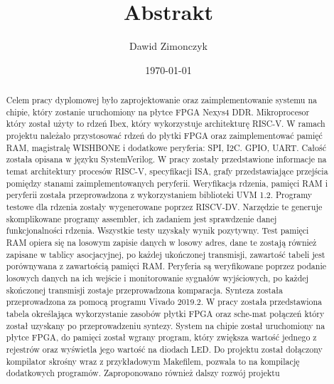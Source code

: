 \documentclass[12pt,a4paper]{article}
\title{Abstrakt}
\author{Dawid Zimonczyk}
\date{\today}
\begin{document}
\renewcommand{\abstractname}{Abstrakt}
\begin{abstract}

Celem pracy dyplomowej było zaprojektowanie oraz zaimplementowanie systemu na chipie, który zostanie uruchomiony na płytce FPGA Nexys4 DDR. Mikroprocesor który został użyty to rdzeń Ibex, który wykorzystuje architekturę RISC-V. W ramach projektu należało przystosować rdzeń do płytki FPGA oraz zaimplementować pamięć RAM, magistralę WISHBONE i dodatkowe peryferia: SPI, I2C. GPIO, UART. Całość została opisana w języku SystemVerilog. W pracy zostały przedstawione informacje na temat architektury procesów RISC-V, specyfikacji ISA, grafy przedstawiające przejścia pomiędzy stanami zaimplementowanych peryferii. Weryfikacja rdzenia, pamięci RAM i peryferii została przeprowadzona z wykorzystaniem biblioteki UVM 1.2. Programy testowe dla rdzenia zostały wygenerowane poprzez RISCV-DV. Narzędzie te generuje skomplikowane programy assembler, ich zadaniem jest sprawdzenie danej funkcjonalności rdzenia. Wszystkie testy uzyskały wynik pozytywny. Test pamięci RAM opiera się na losowym zapisie danych w losowy adres, dane te zostają również zapisane w tablicy asocjacyjnej, po każdej ukończonej transmisji, zawartość tabeli jest porównywana z zawartością pamięci RAM. Peryferia są weryfikowane poprzez podanie losowych danych na ich wejście i monitorowanie sygnałów wyjściowych, po każdej skończonej transmisji zostaje przeprowadzona komparacja. Synteza została przeprowadzona za pomocą programu Vivado 2019.2. W pracy została przedstawiona tabela określająca wykorzystanie zasobów płytki FPGA oraz
sche-mat połączeń który został uzyskany po przeprowadzeniu syntezy. System na chipie został uruchomiony na płytce FPGA, do pamięci został wgrany program, który zwiększa wartość jednego z rejestrów oraz wyświetla jego wartość na diodach LED. Do projektu został dołączony kompilator skrośny wraz z przykładowym Makefilem, pozwala to na kompilację dodatkowych programów. Zaproponowano również dalszy rozwój projektu  

\end{abstract}
\end{document}
